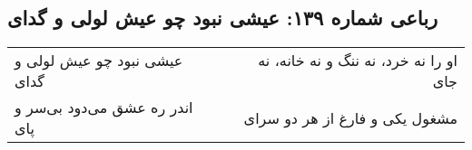 \begin{center}
\section*{رباعی شماره ۱۳۹: عیشی نبود چو عیش لولی و گدای}
\label{sec:139}
\begin{longtable}{l p{0.5cm} r}
عیشی نبود چو عیش لولی و گدای
&&
او را نه خرد، نه ننگ و نه خانه، نه جای
\\
اندر ره عشق می‌دود بی‌سر و پای
&&
مشغول یکی و فارغ از هر دو سرای
\\
\end{longtable}
\end{center}
